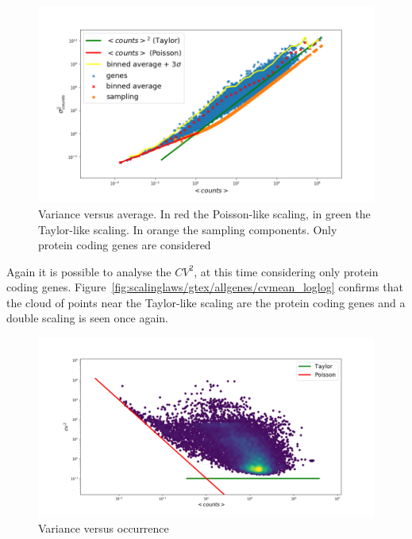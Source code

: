 \begin{figure}[htb!]
    \centering
    \includegraphics[width=0.9\linewidth]{pictures/scalinglaws/gtex/varmean_3sigma.png}
    \caption{Variance versus average. In \textcolor{pythonred}{red} the Poisson-like scaling, in \textcolor{pythongreen}{green} the Taylor-like scaling. In \textcolor{pythonorange}{orange} the sampling components. Only protein coding genes are considered}
    \label{fig:scalinglaws/gtex/varmean_3sigma}
\end{figure}

Again it is possible to analyse the $CV^2$, at this time considering only protein coding genes. Figure~\ref{fig:scalinglaws/gtex/allgenes/cvmean_loglog} confirms that the cloud of points near the Taylor-like scaling are the protein coding genes and a double scaling is seen once again.
\begin{figure}[htb!]
    \centering
    \includegraphics[width=0.9\linewidth]{pictures/scalinglaws/gtex/cvmean_loglog_density.png}
    \caption{Variance versus occurrence}
    \label{fig:scalinglaws/gtex/cvmean_loglog}
\end{figure}

